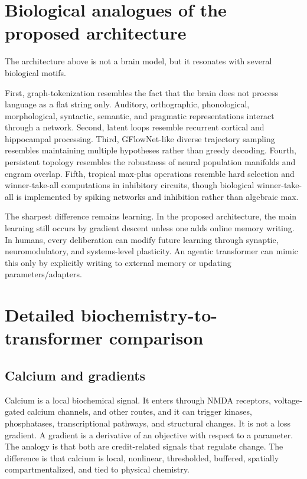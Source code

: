 \documentclass[11pt]{article}
\newcommand{\1}{\mathbf{1}}
\begin{document}
\section{Biological analogues of the proposed architecture}

The architecture above is not a brain model, but it resonates with several biological motifs.

First, graph-tokenization resembles the fact that the brain does not process language as a flat string only. Auditory, orthographic, phonological, morphological, syntactic, semantic, and pragmatic representations interact through a network. Second, latent loops resemble recurrent cortical and hippocampal processing. Third, GFlowNet-like diverse trajectory sampling resembles maintaining multiple hypotheses rather than greedy decoding. Fourth, persistent topology resembles the robustness of neural population manifolds and engram overlap. Fifth, tropical max-plus operations resemble hard selection and winner-take-all computations in inhibitory circuits, though biological winner-take-all is implemented by spiking networks and inhibition rather than algebraic max.

The sharpest difference remains learning. In the proposed architecture, the main learning still occurs by gradient descent unless one adds online memory writing. In humans, every deliberation can modify future learning through synaptic, neuromodulatory, and systems-level plasticity. An agentic transformer can mimic this only by explicitly writing to external memory or updating parameters/adapters.

\section{Detailed biochemistry-to-transformer comparison}

\subsection{Calcium and gradients}

Calcium is a local biochemical signal. It enters through NMDA receptors, voltage-gated calcium channels, and other routes, and it can trigger kinases, phosphatases, transcriptional pathways, and structural changes. It is not a loss gradient. A gradient is a derivative of an objective with respect to a parameter. The analogy is that both are credit-related signals that regulate change. The difference is that calcium is local, nonlinear, thresholded, buffered, spatially compartmentalized, and tied to physical chemistry.
\end{document}
